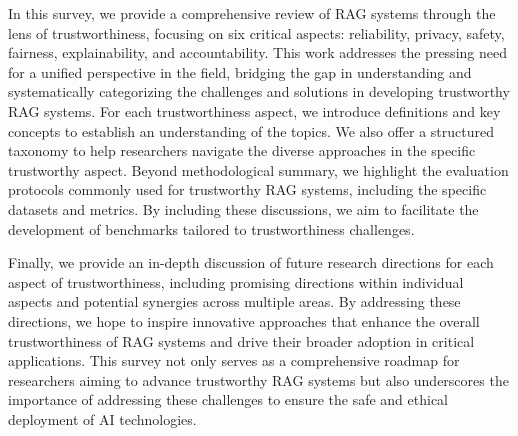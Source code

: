 In this survey, we provide a comprehensive review of RAG systems through the lens of trustworthiness, focusing on six critical aspects: reliability, privacy, safety, fairness, explainability, and accountability. This work addresses the pressing need for a unified perspective in the field, bridging the gap in understanding and systematically categorizing the challenges and solutions in developing trustworthy RAG systems.
For each trustworthiness aspect, we introduce definitions and key concepts to establish an understanding of the topics. We also offer a structured taxonomy to help researchers navigate the diverse approaches in the specific trustworthy aspect. Beyond methodological summary, we highlight the evaluation protocols commonly used for trustworthy RAG systems, including the specific datasets and metrics. By including these discussions, we aim to facilitate the development of benchmarks tailored to trustworthiness challenges. 

Finally, we provide an in-depth discussion of future research directions for each aspect of trustworthiness, including promising directions within individual aspects and potential synergies across multiple areas. By addressing these directions, we hope to inspire innovative approaches that enhance the overall trustworthiness of RAG systems and drive their broader adoption in critical applications. This survey not only serves as a comprehensive roadmap for researchers aiming to advance trustworthy RAG systems but also underscores the importance of addressing these challenges to ensure the safe and ethical deployment of AI technologies.